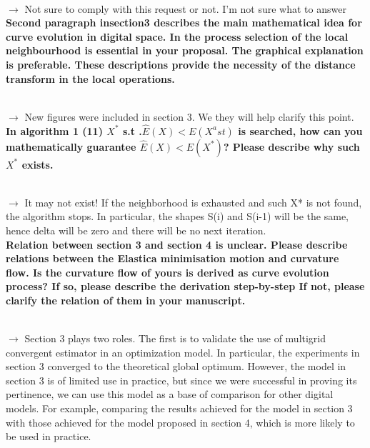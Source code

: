 \documentclass[12pt]{article}
\begin{document}
~\\
$\rightarrow$ Not sure to comply with this request or not. I’m not sure what to answer
~\\


\textbf{Second paragraph insection3 describes the main mathematical idea for curve evolution in digital space. In the process selection of the local neighbourhood is essential in your proposal. The graphical explanation is preferable. These descriptions provide the necessity of the distance transform in the local operations.}

~\\
$\rightarrow$ New figures were included in section 3. We they will help clarify this point.
~\\


\textbf{In algorithm 1 (11) $X^\ast$ s.t .$\hat{E}(X)< E(X^ast)$ is searched, how can you mathematically guarantee $\hat{E}(X)< E(X^\ast)$? Please describe why such $X^{\ast}$ exists.}

~\\
$\rightarrow$ It may not exist! If the neighborhood is exhausted and such X* is not found, the algorithm stops. In particular, the shapes S(i) and S(i-1) will be the same, hence delta will be zero and there will be no next iteration.
~\\


\textbf{Relation between section 3 and section 4 is unclear.
Please describe relations between the Elastica minimisation motion and curvature flow.
Is the curvature flow of yours is derived as curve evolution process?
If so, please describe the derivation step-by-step
If not, please clarify the relation of them in your manuscript.}

~\\
$\rightarrow$ Section 3 plays two roles. The first is to validate the use of multigrid convergent estimator in an optimization model. In particular, the experiments in section 3 converged to the theoretical global optimum. However, the model in section 3 is of limited use in practice, but since we were successful in proving its pertinence, we can use this model as a base of comparison for other digital models. For example, comparing the results achieved for the model in section 3 with those achieved for the model proposed in section 4, which is more likely to be used in practice.
~\\




\end{document}
